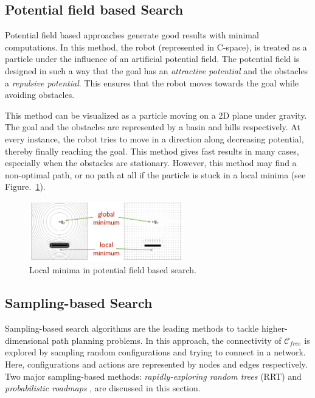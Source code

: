 \subsection{Potential field based Search}
\label{sec:pot_search}
Potential field based approaches generate good results with minimal computations. In this method, the robot (represented in C-space), is treated as a particle under the influence of an artificial potential field. The potential field is designed in such a way that the goal has an \textit{attractive potential} and the obstacles a \textit{repulsive potential}. This ensures that the robot moves towards the goal while avoiding obstacles. 

This method can be visualized as a particle moving on a 2D plane under gravity. The goal and the obstacles are represented by a basin and hills respectively. At every instance, the robot tries to move in a direction along decreasing potential, thereby finally reaching the goal. This method gives fast results in many cases, especially when the obstacles are stationary. However, this method may find a non-optimal path, or no path at all if the particle is stuck in a local minima (see Figure.~\ref{fig:potential_search}).

\begin{figure}
\centering
\includegraphics[width=0.6\textwidth]{./images/potential_search}
\caption{Local minima in potential field based search. \cite{siciliano2010robotics}}
\label{fig:potential_search}
\end{figure}


\subsection{Sampling-based Search}
\label{sec:sampling_search}
Sampling-based search algorithms are the leading methods to tackle higher-dimensional path planning problems. In this approach, the connectivity of $\mathcal{C}_{free}$ is explored by sampling random configurations and trying to connect in a network. Here, configurations and actions are represented by nodes and edges respectively. Two major sampling-based methods: \textit{rapidly-exploring random trees} (RRT) \cite{lavalle2006planning} and \textit{probabilistic roadmaps} \cite{kavraki1994probabilistic}, are discussed in this section.

